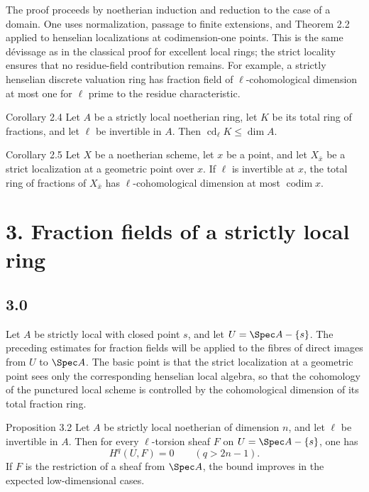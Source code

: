 The proof proceeds by noetherian induction and reduction to the case of a domain. One uses normalization, passage to finite extensions, and Theorem 2.2 applied to henselian localizations at codimension-one points. This is the same dévissage as in the classical proof for excellent local rings; the strict locality ensures that no residue-field contribution remains. For example, a strictly henselian discrete valuation ring has fraction field of \(\ell\)-cohomological dimension at most one for \(\ell\) prime to the residue characteristic.

\begin{statement}{Corollary 2.4}
Let \(A\) be a strictly local noetherian ring, let \(K\) be its total ring of fractions, and let \(\ell\) be invertible in \(A\). Then \(\operatorname{cd}_\ell K\leq\dim A\).
\end{statement}

\begin{statement}{Corollary 2.5}
Let \(X\) be a noetherian scheme, let \(x\) be a point, and let \(X_{\bar x}\) be a strict localization at a geometric point over \(x\). If \(\ell\) is invertible at \(x\), the total ring of fractions of \(X_{\bar x}\) has \(\ell\)-cohomological dimension at most \(\operatorname{codim}x\).
\end{statement}

\section*{3. Fraction fields of a strictly local ring}

\subsection*{3.0}
Let \(A\) be strictly local with closed point \(s\), and let \(U=\Spec A-\{s\}\). The preceding estimates for fraction fields will be applied to the fibres of direct images from \(U\) to \(\Spec A\). The basic point is that the strict localization at a geometric point sees only the corresponding henselian local algebra, so that the cohomology of the punctured local scheme is controlled by the cohomological dimension of its total fraction ring.

\begin{statement}{Proposition 3.2}
Let \(A\) be strictly local noetherian of dimension \(n\), and let \(\ell\) be invertible in \(A\). Then for every \(\ell\)-torsion sheaf \(F\) on \(U=\Spec A-\{s\}\), one has
\[
H^q(U,F)=0\qquad(q>2n-1).
\]
If \(F\) is the restriction of a sheaf from \(\Spec A\), the bound improves in the expected low-dimensional cases.
\end{statement}

